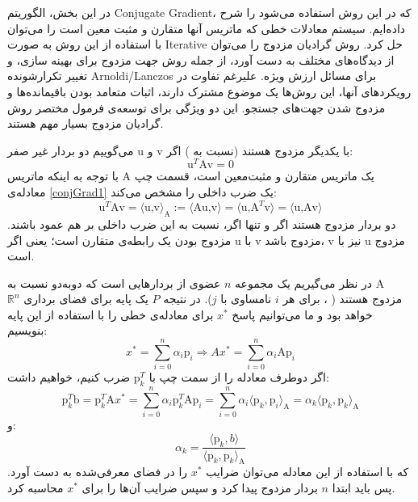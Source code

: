 در این بخش، الگوریتم \gls{Conjugate Gradient}، که در این روش استفاده می‌شود را شرح داده‌ایم. سیستم معادلات خطی که ماتریس آنها متقارن و مثبت معین است را می‌توان با استفاده از این روش به صورت \gls{Iterative} حل کرد. روش گرادیان مزدوج را می‌توان از دیدگاه‌های مختلف به دست آورد، از جمله روش جهت مزدوج برای بهینه سازی، و تغییر تکرارشونده Arnoldi/Lanczos برای مسائل ارزش ویژه. علیرغم تفاوت در رویکردهای آنها، این روش‌ها یک موضوع مشترک دارند، اثبات متعامد بودن باقیمانده‌ها و مزدوج شدن جهت‌های جستجو. این دو ویژگی برای توسعه‌ی فرمول مختصر روش گرادیان مزدوج بسیار مهم هستند.

می‌گوییم دو بردار غیر صفر u و v با یکدیگر مزدوج هستند (نسبت به ) اگر:
\begin{equation} \label{conjGrad1}
	\textrm{u}^T\textrm{Av} = 0
\end{equation}
با توجه به اینکه ماتریس A یک ماتریس متقارن و مثبت‌معین است، قسمت چپ معادله‌ی \ref{conjGrad1} یک ضرب داخلی را مشخص می‌کند:
\begin{equation}
	\textrm{u}^T\textrm{Av} = \langle\textrm{u,v}\rangle_{\textrm{A}} := \langle\textrm{Au,v}\rangle = \langle\textrm{u,A}^T\textrm{v}\rangle = \langle\textrm{u,Av}\rangle
\end{equation}
دو بردار مزدوج هستند اگر و تنها اگر، نسبت به این ضرب داخلی بر هم عمود باشند. مزدوج بودن یک رابطه‌ی متقارن است؛ یعنی اگر u با v مزدوج باشد، v نیز با u مزدوج است.

در نظر می‌گیریم 
یک مجموعه $n$ عضوی از بردار‌هایی است که دوبه‌دو نسبت به A مزدوج هستند (
، برای هر $i$ نامساوی با $j$). در نتیجه $P$ یک پایه برای فضای برداری 
$\mathbb{R}^n$ 
خواهد بود و ما می‌توانیم پاسخ $x^*$ برای معادله‌ی خطی 
را با استفاده از این پایه بنویسیم:
\begin{equation}
	x^* = \sum_{i=0}^n\alpha_i \textrm{p}_i \Rightarrow Ax^* = \sum_{i = 0}^{n} \alpha_i \textrm{A}\textrm{p}_i
\end{equation}
اگر دوطرف معادله را از سمت چپ با $\textrm{p}_k^T$ ضرب کنیم، خواهیم داشت:
\begin{equation}
	\textrm{p}_k^T\textrm{b} = \textrm{p}_k^T\textrm{A}x^* = \sum_{i = 0}^{n} \alpha_i \textrm{p}_k^T \textrm{Ap}_i = \sum_{i = 0}^{n} \alpha_i \langle \textrm{p}_k,\textrm{p}_i\rangle_{\textrm{A}} = \alpha_k \langle \textrm{p}_k,\textrm{p}_k \rangle_{\textrm{A}}
\end{equation}
و:
\begin{equation}
	\alpha_k = \frac{\langle \textrm{p}_k, b \rangle}{\langle \textrm{p}_k, \textrm{p}_k \rangle_{\textrm{A}}}
\end{equation}
که با استفاده از این معادله می‌توان ضرایب $x^*$ را در فضای معرفی‌شده به دست آورد. پس باید ابتدا $n$ بردار مزدوج پیدا کرد و سپس ضرایب آن‌ها را برای $x^*$ محاسبه کرد. 

